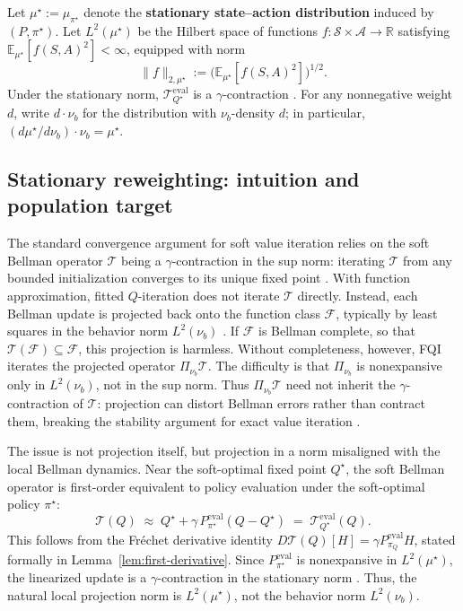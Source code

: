 \documentclass{article}
\theoremstyle{plain}
\theoremstyle{definition}
\theoremstyle{remark}
\newcommand{\E}{\mathbb{E}}
\begin{document}
Let \(\mu^\star:=\mu_{\pi^\star}\) denote the \textbf{stationary state--action
distribution} induced by \((P,\pi^\star)\). Let \(L^2(\mu^\star)\) be the Hilbert space
of functions \(f:\mathcal S\times\mathcal A\to\mathbb R\) satisfying
\(\E_{\mu^\star}[f(S,A)^2]<\infty\), equipped with norm
\[
\|f\|_{2,\mu^\star}
:=
\bigl(\E_{\mu^\star}[f(S,A)^2]\bigr)^{1/2}.
\]
Under the stationary norm, \(\mathcal T^{\mathrm{eval}}_{Q^\star}\) is a
\(\gamma\)-contraction
\citep{bertsekas1996neuro,hallak2016generalized,patterson2022generalized,
vdLaanKallus2025FQE}. For any nonnegative weight \(d\), write \(d\cdot\nu_b\)
for the distribution with \(\nu_b\)-density \(d\); in particular,
\((d\mu^\star/d\nu_b)\cdot\nu_b=\mu^\star\).

\subsection{Stationary reweighting: intuition and population target}
\label{sec:prelim-fqi-weighting}

The standard convergence argument for soft value iteration relies on the soft
Bellman operator \(\mathcal T\) being a \(\gamma\)-contraction in the sup norm:
iterating \(\mathcal T\) from any bounded initialization converges to its unique
fixed point
\citep{bellman1966dynamic,puterman1990markov,bertsekas1996neuro,
geist2019theory}. With function approximation, fitted \(Q\)-iteration does not
iterate \(\mathcal T\) directly. Instead, each Bellman update is projected back
onto the function class \(\mathcal F\), typically by least squares in the
behavior norm \(L^2(\nu_b)\) \citep{munos2008finite}. If \(\mathcal F\) is
Bellman complete, so that \(\mathcal T(\mathcal F)\subseteq\mathcal F\), this
projection is harmless. Without completeness, however, FQI iterates the
projected operator \(\Pi_{\nu_b}\mathcal T\). The difficulty is that
\(\Pi_{\nu_b}\) is nonexpansive only in \(L^2(\nu_b)\), not in the sup norm.
Thus \(\Pi_{\nu_b}\mathcal T\) need not inherit the \(\gamma\)-contraction of
\(\mathcal T\): projection can distort Bellman errors rather than contract them,
breaking the stability argument for exact value iteration
\citep{gordon1995stable,tsitsiklis1996analysis,chen2019information}.

The issue is not projection itself, but projection in a norm misaligned with
the local Bellman dynamics. Near the soft-optimal fixed point \(Q^\star\), the
soft Bellman operator is first-order equivalent to policy evaluation under the
soft-optimal policy \(\pi^\star\):
\begin{equation}
\label{eqn::linapprox}
\mathcal T(Q)
\;\approx\;
Q^\star + \gamma\,P^{\mathrm{eval}}_{\pi^\star}(Q - Q^\star)
\;=\;
\mathcal{T}^{\mathrm{eval}}_{Q^\star}(Q).
\end{equation}
This follows from the Fréchet derivative identity
\(D\mathcal T(Q)[H]=\gamma P^{\mathrm{eval}}_{\pi_Q}H\), stated formally in
Lemma~\ref{lem:first-derivative}. Since \(P^{\mathrm{eval}}_{\pi^\star}\) is
nonexpansive in \(L^2(\mu^\star)\), the linearized update is a
\(\gamma\)-contraction in the stationary norm
\citep{patterson2022generalized,vdLaanKallus2025FQE}. Thus, the natural local
projection norm is \(L^2(\mu^\star)\), not the behavior norm \(L^2(\nu_b)\).
\end{document}
